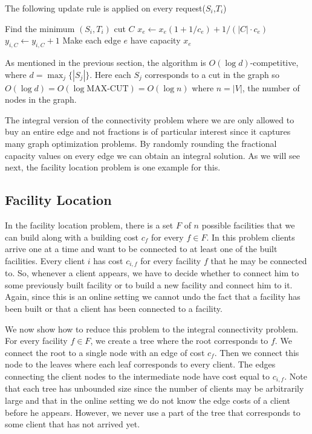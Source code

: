 \begin{algorithm}
\caption{The following update rule is applied on every request($S_i$,$T_i$)}
\begin{algorithmic}[1]
  \STATE Find the minimum  $(S_i,T_i)$ cut $C$
    \STATE $x_e \leftarrow x_e (1 + 1/c_e) + 1/(|C| \cdot c_e)$ 
  \ENDFOR
  \STATE $y_{i,C} \leftarrow y_{i,C} + 1$
\ENDWHILE
\STATE Make each edge $e$ have capacity $x_e$
\end{algorithmic}
\end{algorithm}

As mentioned in the previous section, the algorithm is $O(\log d)$-competitive, where $d = \max_j\{|S_j|\}$. Here each $S_j$ corresponds to a cut in the graph so $O( \log d ) = O( \log \textrm{MAX-CUT} ) = O( \log n )$ where $n = |V|$, the number of nodes in the graph.

The integral version of the connectivity problem where we are only allowed to buy an entire edge and not fractions is of particular interest since it captures many graph optimization problems. By randomly rounding the fractional capacity values on every edge we can obtain an integral solution. 
As we will see next, the facility location problem is one example for this.

\subsection{Facility Location}
In the facility location problem, there is a set $F$ of $n$ possible facilities that we can build along with a building cost $c_f$ for every $f \in F$. In this problem clients arrive one at a time and want to be connected to at least one of the built facilities. Every client $i$ has  cost $c_{i,f}$ for every facility $f$ that he may be connected to. 
So, whenever a client appears, we have to decide whether to connect him to some previously built facility or to build a new facility and connect him to it. Again, since this is an online setting we cannot undo the fact that a facility has been built or that a client has been connected to a facility.

We now show how to reduce this problem to the integral connectivity problem. For every facility $f \in F$, we create a tree where the root corresponds to $f$. We connect the root to a single node with an edge of cost $c_f$. Then we connect this node to the leaves where each leaf corresponds to every client. The edges connecting the client nodes to the intermediate node have cost equal to $c_{i,f}$. Note that each tree has unbounded size since the number of clients may be arbitrarily large and that in the online setting we do not know the edge costs of a client before he appears. However, we never use a part of the tree that corresponds to some client that has not arrived yet.

